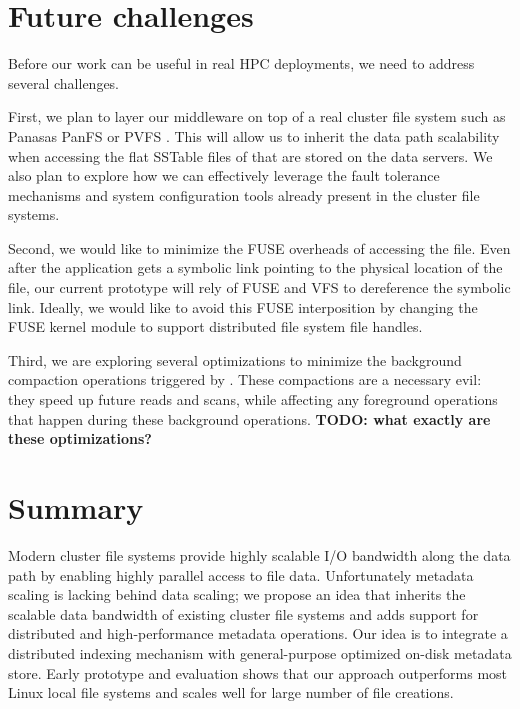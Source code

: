 \section{Future challenges}
\label{futurework}

Before our work can be useful in real HPC deployments, we need to address
several challenges.

First, we plan to layer our middleware on top of a real cluster file system
such as Panasas PanFS \citep{panfs:welch08} or PVFS \citep{pvfs:www}. This will
allow us to inherit the data path scalability when accessing the flat SSTable
files of \ldb that are stored on the data servers. We also plan to explore how
we can effectively leverage the fault tolerance mechanisms and system
configuration tools already present in the cluster file systems.

Second, we would like to minimize the FUSE overheads of accessing the file.
Even after the application gets a symbolic link pointing to the physical
location of the file, our current prototype will rely of FUSE and VFS to
dereference the symbolic link. Ideally, we would like to avoid this FUSE
interposition by changing the FUSE kernel module to support distributed file
system file handles. 

Third, we are exploring several optimizations to minimize the background
compaction operations triggered by \ldb. These compactions are a necessary
evil: they speed up future reads and scans, while affecting any foreground
operations that happen during these background operations. {\bf TODO: what
exactly are these optimizations?}

\section{Summary}
\label{summary}

Modern cluster file systems provide highly scalable I/O bandwidth along the
data path by enabling highly parallel access to file data.
Unfortunately metadata scaling is lacking behind data scaling; we propose an
idea that inherits the scalable data bandwidth of existing cluster file systems
and adds support for distributed and high-performance metadata operations.
Our idea is to integrate a distributed indexing mechanism with general-purpose
optimized on-disk metadata store.
Early prototype and evaluation shows that our approach outperforms most Linux
local file systems and scales well for large number of file creations. 





